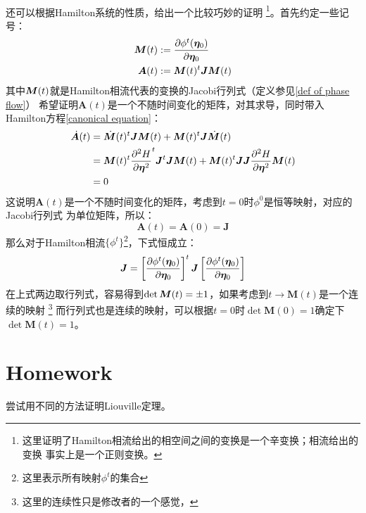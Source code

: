     \paragraph{}
    还可以根据Hamilton系统的性质，给出一个比较巧妙的证明
    \footnote{
        这里证明了Hamilton相流给出的相空间之间的变换是一个辛变换；相流给出的变换
        事实上是一个正则变换。
    }。首先约定一些记号：
    \begin{equation}
        \begin{split}
            \bm{M}(t) &:= \frac{\partial{\phi^t(\bm{\eta}_0)}}{\partial{\bm{\eta}_0}}\\
            \bm{A}(t) &:= \bm{M}(t)^t\bm{J}\bm{M}(t)
        \end{split}
    \end{equation}
    其中$\displaystyle\bm{M}(t)$就是Hamilton相流代表的变换的Jacobi行列式（定义参见\ref{def of phase flow}）
    希望证明$\bm{A}(t)$是一个不随时间变化的矩阵，对其求导，同时带入Hamilton方程\ref{canonical equation}：
    \begin{equation}
        \begin{split}
            \dot{\bm{A}}(t) &= \dot{\bm{M}}(t)^t\bm{J}\bm{M}(t) + \bm{M}(t)^t\bm{J}\dot{\bm{M}}(t)\\
            &= \bm{M}(t)^t\frac{\partial{^2 H}}{\partial{\bm{\eta}^2}}^t \bm{J}^t\bm{J}\bm{M}(t) + \bm{M}(t)^t\bm{J}\bm{J}
            \frac{\partial{^2 H}}{\partial{\bm{\eta}^2}}\bm{M}(t)\\
            &= 0
        \end{split}
    \end{equation}
    这说明$\bm{A}(t)$是一个不随时间变化的矩阵，考虑到$t=0$时$\phi^0$是恒等映射，对应的Jacobi行列式
    为单位矩阵，所以：
    \begin{equation}
        \bm{A}(t) = \bm{A}(0) = \bm{J}
    \end{equation}
    那么对于Hamilton相流$\{\phi^t\}$\footnote{这里表示所有映射$\phi^t$的集合}，下式恒成立：
    \begin{equation}
        \bm{J} = \left[\frac{\partial{\phi^t(\bm{\eta}_0)}}{\partial{\bm{\eta}_0}}\right]^t \bm{J} \left[\frac{\partial{\phi^t(\bm{\eta}_0)}}{\partial{\bm{\eta}_0}}\right]
    \end{equation}
    在上式两边取行列式，容易得到$\displaystyle\det\bm{M}(t) = \pm 1$，如果考虑到$t\to\bm{M}(t)$是一个连续的映射
    \footnote{这里的连续性只是修改者的一个感觉，}
    而行列式也是连续的映射，可以根据$t=0$时$\det\bm{M}(0) = 1$确定下$\det\bm{M}(t) = 1$。
    \section{Homework}
    \begin{asg}
        尝试用不同的方法证明Liouville定理。
    \end{asg}


    
    
